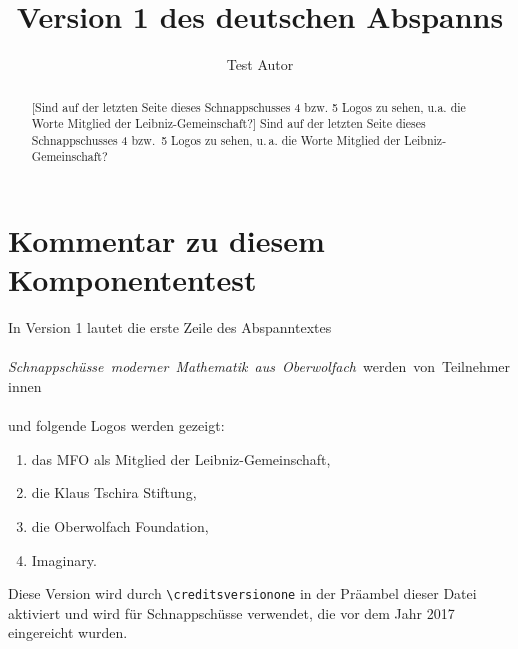 \documentclass{snapshotmfo}
\author{Test Autor}
\title{Version 1 des deutschen Abspanns}
\begin{document}
\begin{abstract}[Sind auf der letzten Seite dieses Schnappschusses 4 bzw. 5 Logos zu sehen, u.a. die Worte \glqq Mitglied der Leibniz-Gemeinschaft\grqq ?]
Sind auf der letzten Seite dieses Schnappschusses 4 bzw.\ 5 Logos zu sehen, u.\,a. die Worte \glqq Mitglied der Leibniz-Gemeinschaft\grqq ?
\end{abstract}

\section{Kommentar zu diesem Komponententest}
In Version 1 lautet die erste Zeile des Abspanntextes\\
\\
\hbox{\emph{Schnappsch\"usse moderner Mathematik aus Oberwolfach} werden von Teilnehmerinnen}\\
\\
und folgende Logos werden gezeigt:
\begin{enumerate}
  \item das MFO als Mitglied der Leibniz-Gemeinschaft,
  \item die Klaus Tschira Stiftung,
  \item die Oberwolfach Foundation,
  \item Imaginary.
\end{enumerate}
Diese Version wird durch \verb+\creditsversionone+ in der Präambel dieser Datei aktiviert
und wird für Schnappschüsse verwendet, die vor dem Jahr 2017 eingereicht wurden.
\end{document}
